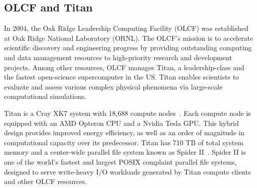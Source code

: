 \subsection{OLCF and Titan}

In 2004, the Oak Ridge Leadership Computing Facility (OLCF) was established at
Oak Ridge National Laboratory (ORNL). The OLCF's mission is to accelerate
scientific discovery and engineering progress by providing outstanding computing
and data management resources to high-priority research and development
projects. Among other resources, OLCF manages Titan, a leadership-class and the
fastest open-science supercomputer in the US. Titan enables scientists to
evaluate and assess various complex physical phenomena via large-scale
computational simulations.

Titan is a Cray XK7 system with 18,688 compute nodes~\cite{top500}. Each compute
node is equipped with an AMD Opteron CPU and a Nvidia Tesla GPU. This hybrid
design provides improved energy efficiency, as well as an order of magnitude in
computational capacity over its predecessor. Titan has 710 TB of total system
memory and a center-wide parallel file system known as Spider II~\cite{spider2}.
Spider II is one of the world's fastest and largest POSIX complaint parallel
file systems, designed to serve write-heavy I/O workloads generated by Titan
compute clients and other OLCF resources.


%
%
%
%
%

